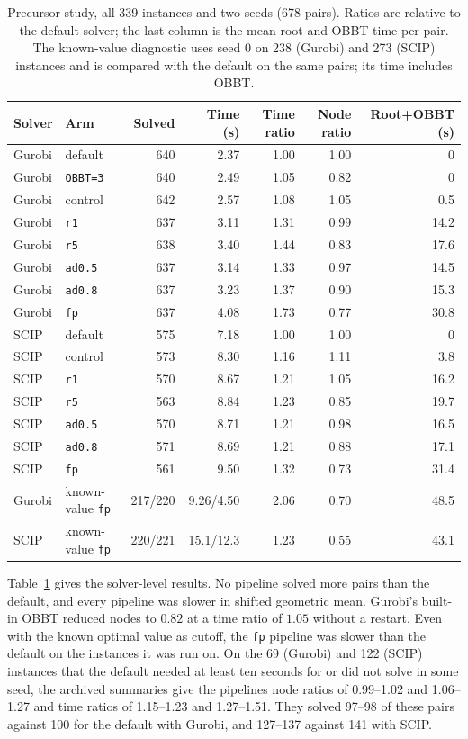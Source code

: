 \begin{table}[htbp]
\centering
\small
\begin{tabular}{@{}llrrrrr@{}}
\toprule
Solver & Arm & Solved & Time (s) & Time ratio & Node ratio & Root+OBBT (s)\\
\midrule
Gurobi & default & 640 & 2.37 & 1.00 & 1.00 & 0\\
Gurobi & \texttt{OBBT=3} & 640 & 2.49 & 1.05 & 0.82 & 0\\
Gurobi & control & 642 & 2.57 & 1.08 & 1.05 & 0.5\\
Gurobi & \texttt{r1} & 637 & 3.11 & 1.31 & 0.99 & 14.2\\
Gurobi & \texttt{r5} & 638 & 3.40 & 1.44 & 0.83 & 17.6\\
Gurobi & \texttt{ad0.5} & 637 & 3.14 & 1.33 & 0.97 & 14.5\\
Gurobi & \texttt{ad0.8} & 637 & 3.23 & 1.37 & 0.90 & 15.3\\
Gurobi & \texttt{fp} & 637 & 4.08 & 1.73 & 0.77 & 30.8\\
\addlinespace
SCIP & default & 575 & 7.18 & 1.00 & 1.00 & 0\\
SCIP & control & 573 & 8.30 & 1.16 & 1.11 & 3.8\\
SCIP & \texttt{r1} & 570 & 8.67 & 1.21 & 1.05 & 16.2\\
SCIP & \texttt{r5} & 563 & 8.84 & 1.23 & 0.85 & 19.7\\
SCIP & \texttt{ad0.5} & 570 & 8.71 & 1.21 & 0.98 & 16.5\\
SCIP & \texttt{ad0.8} & 571 & 8.69 & 1.21 & 0.88 & 17.1\\
SCIP & \texttt{fp} & 561 & 9.50 & 1.32 & 0.73 & 31.4\\
\addlinespace
Gurobi & known-value \texttt{fp} & 217/220 & 9.26/4.50 & 2.06 & 0.70 & 48.5\\
SCIP & known-value \texttt{fp} & 220/221 & 15.1/12.3 & 1.23 & 0.55 & 43.1\\
\bottomrule
\end{tabular}
\caption{Precursor study, all 339 instances and two seeds (678 pairs). Ratios
are relative to the default solver; the last column is the mean root and OBBT
time per pair. The known-value diagnostic uses seed $0$ on 238 (Gurobi) and 273
(SCIP) instances and is compared with the default on the same pairs; its time
includes OBBT.}
\label{tab:precursor-solver}
\end{table}

Table~\ref{tab:precursor-solver} gives the solver-level results. No pipeline
solved more pairs than the default, and every pipeline was slower in shifted
geometric mean. Gurobi's built-in OBBT reduced nodes to $0.82$ at a time ratio of
$1.05$ without a restart. Even with the known optimal value as cutoff, the
\texttt{fp} pipeline was slower than the default on the instances it was run on.
On the 69 (Gurobi) and 122 (SCIP) instances that the default needed at least ten
seconds for or did not solve in some seed, the archived summaries give the
pipelines node ratios of
0.99--1.02 and 1.06--1.27 and time ratios of 1.15--1.23 and 1.27--1.51. They
solved 97--98 of these pairs against 100 for the default with Gurobi, and
127--137 against 141 with SCIP.

